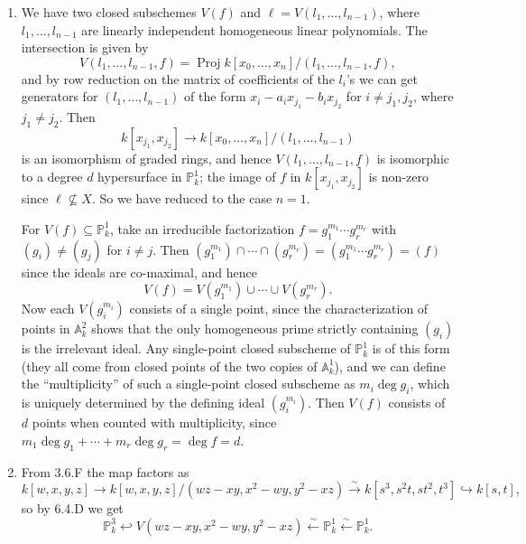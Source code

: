 \documentclass{report}
\newcommand{\A}{\mathbb{A}}
\renewcommand{\P}{\mathbb{P}} %
\DeclareMathOperator{\Proj}{Proj}
\begin{document}
\begin{enumerate}[label=\textbf{8.2.\Alph*.}]
	\item We have two closed subschemes $V(f)$ and $\ell=V(l_1,\ldots,l_{n-1})$,
	      where $l_1,\ldots,l_{n-1}$ are linearly independent homogeneous linear
	      polynomials. The intersection is given by
	      \begin{equation*}
		      V(l_1,\ldots,l_{n-1},f)
		      = \Proj k[x_0,\ldots,x_n]/(l_1,\ldots,l_{n-1},f),
	      \end{equation*}
	      and by row reduction on the matrix of coefficients of the $l_i$'s we can
	      get generators for $(l_1,\ldots,l_{n-1})$ of the form
	      $x_i-a_ix_{j_1}-b_ix_{j_2}$ for $i\ne j_1,j_2$, where $j_1\ne j_2$. Then
	      \begin{equation*}
		      k[x_{j_1},x_{j_2}]\to
		      k[x_0,\ldots,x_n]/(l_1,\ldots,l_{n-1})
	      \end{equation*}
	      is an isomorphism of graded rings, and hence $V(l_1,\ldots,l_{n-1},f)$
	      is isomorphic to a degree $d$ hypersurface in $\P^1_k$; the image of $f$
	      in $k[x_{j_1},x_{j_2}]$ is non-zero since $\ell\not\subseteq X$. So we
	      have reduced to the case $n=1$.

	      For $V(f)\subseteq\P^1_k$, take an irreducible factorization
	      $f=g_1^{m_1}\cdots g_r^{m_r}$ with $(g_i)\ne(g_j)$ for $i\ne j$. Then
	      $(g_1^{m_1})\cap\cdots\cap(g_r^{m_r})=(g_1^{m_1}\cdots g_r^{m_r})=(f)$
	      since the ideals are co-maximal, and hence
	      \begin{equation*}
		      V(f)=V(g_1^{m_1})\cup\cdots\cup V(g_r^{m_r}).
	      \end{equation*}
	      Now each $V(g_i^{m_i})$ consists of a single point, since the
	      characterization of points in $\A^2_k$ shows that the only homogeneous
	      prime strictly containing $(g_i)$ is the irrelevant ideal. Any
	      single-point closed subscheme of $\P^1_k$ is of this form (they all come
	      from closed points of the two copies of $\A^1_k$), and we can define the
	      ``multiplicity'' of such a single-point closed subscheme as
	      $m_i\deg g_i$, which is uniquely determined by the defining ideal
	      $(g_i^{m_i})$. Then $V(f)$ consists of $d$ points when counted with
	      multiplicity, since $m_1\deg g_1+\cdots+m_r\deg g_r=\deg f=d$.

	\item From 3.6.F the map factors as
	      \begin{equation*}
		      k[w,x,y,z]
		      \to k[w,x,y,z]/(wz-xy,x^2-wy,y^2-xz)
		      \xrightarrow\sim k[s^3,s^2t,st^2,t^3]
		      \hookrightarrow k[s,t],
	      \end{equation*}
	      so by 6.4.D we get
	      \begin{equation*}
		      \P^3_k
		      \hookleftarrow V(wz-xy,x^2-wy,y^2-xz)
		      \xleftarrow\sim \P^1_k
		      \xleftarrow\sim \P^1_k.
	      \end{equation*}


\end{enumerate}
\end{document}
